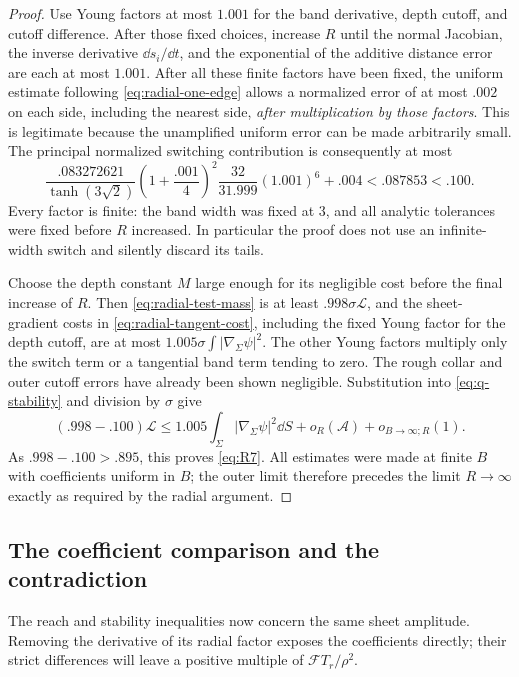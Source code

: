 \begin{proof}
Use Young factors at most $1.001$ for the band derivative, depth cutoff, and cutoff difference. After those fixed choices, increase $R$ until the normal Jacobian, the inverse derivative $\dd s_i/\dd t$, and the exponential of the additive distance error are each at most $1.001$. After all these finite factors have been fixed, the uniform estimate following \eqref{eq:radial-one-edge} allows a normalized error of at most $.002$ on each side, including the nearest side, \emph{after multiplication by those factors}. This is legitimate because the unamplified uniform error can be made arbitrarily small.  The principal normalized switching contribution is consequently at most
\begin{equation}\label{eq:radial-finite-budget}
 \frac{.083272621}{\tanh(3\sqrt2)}
 \left(1+\frac{.001}{4}\right)^2
 \frac{32}{31.999}(1.001)^6+.004
 <.087853<.100.
\end{equation}
Every factor is finite: the band width was fixed at $3$, and all analytic tolerances were fixed before $R$ increased. In particular the proof does not use an infinite-width switch and silently discard its tails.

Choose the depth constant $M$ large enough for its negligible cost before the final increase of $R$. Then \eqref{eq:radial-test-mass} is at least
$.998\sigma\mathcal L$, and the sheet-gradient costs in
\eqref{eq:radial-tangent-cost}, including the fixed Young factor for the depth cutoff, are at most
$1.005\sigma\int|\nabla_\Sigma\psi|^2$.
The other Young factors multiply only the switch term or a tangential band term tending to zero. The rough collar and outer cutoff errors have already been shown negligible. Substitution into \eqref{eq:q-stability} and division by $\sigma$ give
\[
 (.998-.100)\mathcal L
 \le1.005\int_\Sigma|\nabla_\Sigma\psi|^2\dd S
       +o_R(\mathcal A)+o_{B\to\infty;R}(1).
\]
As $.998-.100>.895$, this proves \eqref{eq:R7}. All estimates were made at finite $B$ with coefficients uniform in $B$; the outer limit therefore precedes the limit $R\to\infty$ exactly as required by the radial argument.
\end{proof}

\subsection{The coefficient comparison and the contradiction}

The reach and stability inequalities now concern the same sheet
amplitude. Removing the derivative of its radial factor exposes the
coefficients directly; their strict differences will leave a positive
multiple of $\mathcal F T_r/\rho^2$.

